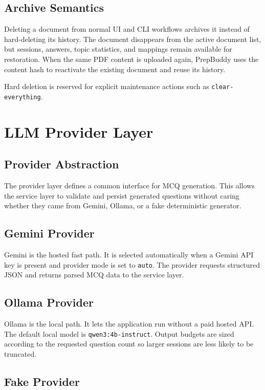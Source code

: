 \documentclass[11pt]{article}
\begin{document}
\subsection{Archive Semantics}

Deleting a document from normal UI and CLI workflows archives it instead of hard-deleting its history. The document disappears from the active document list, but sessions, answers, topic statistics, and mappings remain available for restoration. When the same PDF content is uploaded again, PrepBuddy uses the content hash to reactivate the existing document and reuse its history.

Hard deletion is reserved for explicit maintenance actions such as \texttt{clear-everything}.

\section{LLM Provider Layer}

\subsection{Provider Abstraction}

The provider layer defines a common interface for MCQ generation. This allows the service layer to validate and persist generated questions without caring whether they came from Gemini, Ollama, or a fake deterministic generator.

\subsection{Gemini Provider}

Gemini is the hosted fast path. It is selected automatically when a Gemini API key is present and provider mode is set to \texttt{auto}. The provider requests structured JSON and returns parsed MCQ data to the service layer.

\subsection{Ollama Provider}

Ollama is the local path. It lets the application run without a paid hosted API. The default local model is \texttt{qwen3:4b-instruct}. Output budgets are sized according to the requested question count so larger sessions are less likely to be truncated.

\subsection{Fake Provider}
\end{document}
